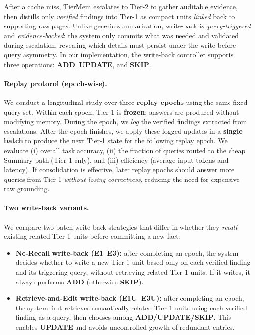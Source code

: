 \documentclass{article}
\theoremstyle{plain}
\theoremstyle{definition}
\theoremstyle{remark}
\begin{document}
After a cache miss, TierMem escalates to Tier-2 to gather auditable evidence, then distills only \emph{verified} findings into Tier-1 as compact units \emph{linked} back to supporting raw pages.
Unlike generic summarization, write-back is \emph{query-triggered} and \emph{evidence-backed}: the system only commits what was needed and validated during escalation, revealing which details must persist under the write-before-query asymmetry.
In our implementation, the write-back controller supports three operations: \textbf{ADD}, \textbf{UPDATE}, and \textbf{SKIP}. 

\paragraph{Replay protocol (epoch-wise).}
We conduct a longitudinal study over three \textbf{replay epochs} using the same fixed query set.
Within each epoch, Tier-1 is \textbf{frozen}: answers are produced without modifying memory.
During the epoch, we \emph{log} the verified findings extracted from escalations.
After the epoch finishes, we apply these logged updates in a \textbf{single batch} to produce the next Tier-1 state for the following replay epoch.
We evaluate (i) overall task accuracy, (ii) the fraction of queries routed to the cheap Summary path (Tier-1 only), and (iii) efficiency (average input tokens and latency).
If consolidation is effective, later replay epochs should answer more queries from Tier-1 \emph{without losing correctness}, reducing the need for expensive raw grounding.

\paragraph{Two write-back variants.}
We compare two batch write-back strategies that differ in whether they \emph{recall} existing related Tier-1 units before committing a new fact:

\begin{itemize}
    \item \textbf{No-Recall write-back (E1--E3):} after completing an epoch, the system decides whether to write a new Tier-1 unit based only on each verified finding and its triggering query, without retrieving related Tier-1 units. If it writes, it always performs \textbf{ADD} (otherwise \textbf{SKIP}).
    \item \textbf{Retrieve-and-Edit write-back (E1U--E3U):} after completing an epoch, the system first retrieves semantically related Tier-1 units using each verified finding as a query, then chooses among \textbf{ADD/UPDATE/SKIP}. This enables \textbf{UPDATE} and avoids uncontrolled growth of redundant entries.
\end{itemize}
\end{document}
